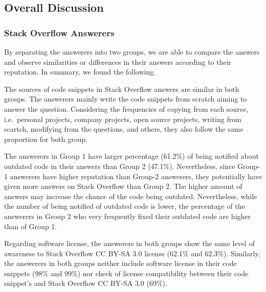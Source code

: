 \documentclass{svjour3}                     %
\newcommand\FIXME[1]{{\color{red}\textbf{FIXME: #1}}}
\begin{document}
\vspace{0.5cm} \noindent{} \vspace{0.5cm}


\subsection{Overall Discussion}

\subsubsection{Stack Overflow Answerers}
By separating the answerers into two groups, we are able to compare the answers and
observe similarities or differences in their answers according to their reputation. In summary, we found the
following.

The sources of code snippets in Stack Overflow answers are similar in both
groups. The answerers mainly write the code snippets from scratch aiming to
answer the question. Considering the frequencies of copying from each source,
i.e.~personal projects, company projects, open source projects, writing from
scartch, modifying from the questions, and others, they also follow the same
proportion for both group.

The answerers in Group 1 have larger percentage (61.2\%) of being notified about
outdated code in their answers than Group 2 (47.1\%). Nevertheless, since
Group-1 answerers have higher reputation than Group-2 answerers, they
potentially have given more answers on Stack Overflow than Group 2. The higher amount of
answers may increase the chance of the code being outdated. Nevertheless, while the number of being notified of
outdated code is lower, the percentage of the answerers in Group 2 who very
frequently fixed their outdated code are higher than of Group 1.


Regarding software license, the answerers in both groups show the same level of
awareness to Stack Overflow CC BY-SA 3.0 license (62.1\% and 62.3\%). Similarly,
the answerers in both groups neither include software license in their code
snippets (98\% and 99\%) nor check of license compatibility between their
code snippet's and Stack Overflow CC BY-SA 3.0 (69\%). 
\end{document}

